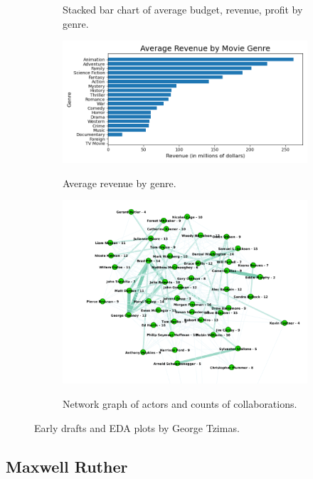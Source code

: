 \documentclass[12pt]{article}
\begin{document}
\begin{figure}[H]
\begin{subfigure}[b]{0.32\textwidth}
\label{fig:sub1}
\caption{Stacked bar chart of average budget, revenue, profit by genre.}
\end{subfigure}
\hfill
\begin{subfigure}[b]{0.33\textwidth}
\centering
\includegraphics[width=1\textwidth]{images/george_viz/mean_revenue_by_genre.png}
\label{fig:sub1}
\caption{Average revenue by genre.}
\end{subfigure}
\hfill
\begin{subfigure}[b]{0.33\textwidth}
\centering
\includegraphics[width=1\textwidth]{images/george_viz/network_graph_actors.png}
\label{fig:sub1}
\caption{Network graph of actors and counts of collaborations.}
\end{subfigure}

\caption{Early drafts and EDA plots by George Tzimas.}
\label{fig:test}
\end{figure}
\newpage
\subsection{Maxwell Ruther}
\end{document}
